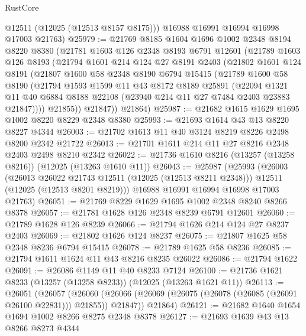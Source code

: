 \begin{lexlean}{RustCore}
\begin{coremodule}
        @12511
        (@12025 (@12513 @8157 @8175)))
      @16988
      @16991
      @16994
      @16998
      @17003
      @21763)
@25979 := @21769
    @8185
    @1604
    @1696
    @1002
    @2348
    @8194
    @8220
    @8380
    (@21781
      @1603
      @126
      @2348
      @8193
      @6791
      @12601
      (@21789
        @1603
        @126
        @8193
        (@21794
          @1601
          @214
          @124
          @27
          @8191
          @2403
          (@21802
            @1601
            @124
            @8191
            (@21807
              @1600
              @58
              @2348
              @8190
              @6794
              @15415
              (@21789
                @1600
                @58
                @8190
                (@21794
                  @1593
                  @1599
                  @11
                  @43
                  @8172
                  @8189
                  @25891
                  (@22094
                    @1321
                    @11
                    @40
                    @6884
                    @8188
                    @22108
                    (@23940 @214 @11 @27 @7484 @2403 @23883 @21847))))
              @21855))
          @21847))
      @21864)
@25987 := @21682 @1615 @1629 @1695 @1002 @8220 @8229 @2348 @8380
@25993 := @21693 @1614 @43 @13 @8220 @8227 @4344
@26003 := @21702 @1613 @11 @40 @3124 @8219 @8226 @2498 @8200 @2342 @21722
@26013 := @21701 @1611 @214 @11 @27 @8216 @2348 @2403 @2498 @8210 @2342
@26022 := @21736 @1610 @8216 (@13257 (@13258 @8216)) (@12025 (@13263 @1610 @11))
@26043 := @25987
    (@25993
      (@26003
        (@26013 @26022 @21743 @12511 (@12025 (@12513 @8211 @2348)))
        @12511
        (@12025 (@12513 @8201 @8219)))
      @16988
      @16991
      @16994
      @16998
      @17003
      @21763)
@26051 := @21769 @8229 @1629 @1695 @1002 @2348 @8240 @8266 @8378
@26057 := @21781 @1628 @126 @2348 @8239 @6791 @12601
@26060 := @21789 @1628 @126 @8239
@26066 := @21794 @1626 @214 @124 @27 @8237 @2403
@26069 := @21802 @1626 @124 @8237
@26075 := @21807 @1625 @58 @2348 @8236 @6794 @15415
@26078 := @21789 @1625 @58 @8236
@26085 := @21794 @1611 @1624 @11 @43 @8216 @8235 @26022
@26086 := @21794 @1622
@26091 := @26086 @1149 @11 @40 @8233 @7124
@26100 := @21736 @1621 @8233 (@13257 (@13258 @8233)) (@12025 (@13263 @1621 @11))
@26113 := @26051
    (@26057
      (@26060 (@26066 (@26069 (@26075 (@26078 (@26085 (@26091 @26100 @22831))) @21855)) @21847))
      @21864)
@26121 := @21682 @1640 @1654 @1694 @1002 @8266 @8275 @2348 @8378
@26127 := @21693 @1639 @43 @13 @8266 @8273 @4344

\end{coremodule}
\end{lexlean}

